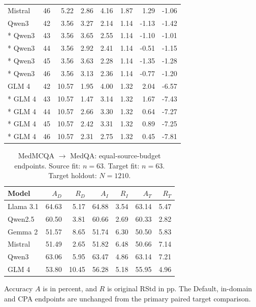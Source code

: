 {\begin{longtable}{lrrrrrrr}
Mistral & 46 & 5.22 & 2.86 & 4.16 & 1.87 & 1.29 & -1.06\\
Qwen3 & 42 & 3.56 & 3.27 & 2.14 & 1.14 & -1.13 & -1.42\\*
Qwen3 & 43 & 3.56 & 3.65 & 2.55 & 1.14 & -1.10 & -1.01\\*
Qwen3 & 44 & 3.56 & 2.92 & 2.41 & 1.14 & -0.51 & -1.15\\*
Qwen3 & 45 & 3.56 & 3.63 & 2.28 & 1.14 & -1.35 & -1.28\\*
Qwen3 & 46 & 3.56 & 3.13 & 2.36 & 1.14 & -0.77 & -1.20\\
GLM 4 & 42 & 10.57 & 1.95 & 4.00 & 1.32 & 2.04 & -6.57\\*
GLM 4 & 43 & 10.57 & 1.47 & 3.14 & 1.32 & 1.67 & -7.43\\*
GLM 4 & 44 & 10.57 & 2.66 & 3.30 & 1.32 & 0.64 & -7.27\\*
GLM 4 & 45 & 10.57 & 2.42 & 3.31 & 1.32 & 0.89 & -7.25\\*
GLM 4 & 46 & 10.57 & 2.31 & 2.75 & 1.32 & 0.45 & -7.81\\
\end{longtable}}


\begin{table}[H]
\centering\small\setlength{\tabcolsep}{5pt}
\caption{MedMCQA $\to$ MedQA: equal-source-budget endpoints. Source fit: $n=63$. Target fit: $n=63$. Target holdout: $N=1210$.}\label{tab:eq-endpoints-medmcqa}
\begin{tabular}{lrrrrrr}
\toprule
Model & $A_D$ & $R_D$ & $A_I$ & $R_I$ & $A_T$ & $R_T$\\
\midrule
Llama 3.1 & 64.63 & 5.17 & 64.88 & 3.54 & 63.14 & 5.47\\
Qwen2.5 & 60.50 & 3.81 & 60.66 & 2.69 & 60.33 & 2.82\\
Gemma 2 & 51.57 & 8.65 & 51.74 & 6.30 & 50.50 & 5.83\\
Mistral & 51.49 & 2.65 & 51.82 & 6.48 & 50.66 & 7.14\\
Qwen3 & 63.06 & 5.95 & 63.47 & 4.86 & 63.14 & 7.21\\
GLM 4 & 53.80 & 10.45 & 56.28 & 5.18 & 55.95 & 4.96\\
\bottomrule
\end{tabular}
\par\vspace{3pt}\begin{minipage}{.98\linewidth}\footnotesize Accuracy $A$ is in percent, and $R$ is original RStd in pp. The Default, in-domain and CPA endpoints are unchanged from the primary paired target comparison.\end{minipage}
\end{table}


